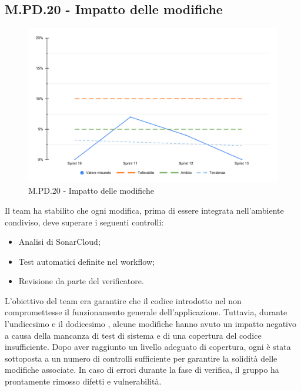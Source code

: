 \subsection{M.PD.20 - Impatto delle modifiche}

\begin{figure}[H]
  \centering
  \includegraphics[width=\textwidth]{assets/impatto_modifiche.pdf}
  \caption{M.PD.20 - Impatto delle modifiche}
\end{figure}

\par Il team ha stabilito che ogni modifica, prima di essere integrata nell'ambiente condiviso, deve superare i seguenti controlli:
\begin{itemize}
  \item Analisi di SonarCloud;
  \item Test automatici definite nel workflow;
  \item Revisione da parte del verificatore.
\end{itemize}

\vspace{0.5\baselineskip}
\par L'obiettivo del team era garantire che il codice introdotto nel  non compromettesse il funzionamento generale dell'applicazione. Tuttavia, durante l'undicesimo e il dodicesimo , alcune modifiche hanno avuto un impatto negativo a causa della mancanza di test di sistema e di una copertura del codice insufficiente. Dopo aver raggiunto un livello adeguato di copertura, ogni  è stata sottoposta a un numero di controlli sufficiente per garantire la solidità delle modifiche associate. In caso di errori durante la fase di verifica, il gruppo ha prontamente rimosso difetti e vulnerabilità.